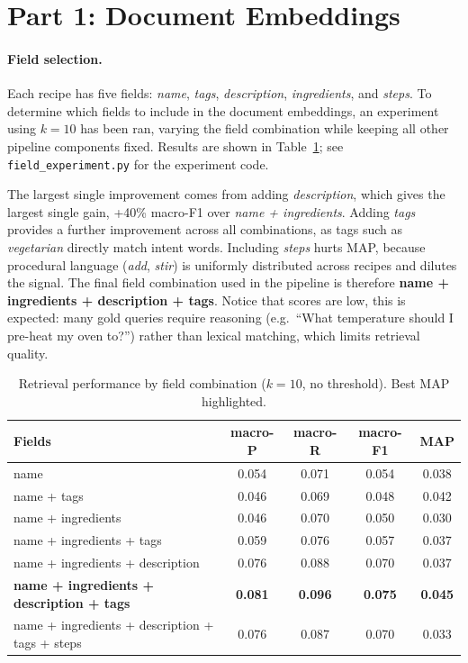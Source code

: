 \documentclass[a4paper,11pt]{article}
\begin{document}
\newpage
\section*{Part 1: Document Embeddings}
\label{sec:embeddings}

\paragraph{Field selection.}
Each recipe has five fields: \textit{name}, \textit{tags}, \textit{description}, \textit{ingredients}, and \textit{steps}. To determine which fields to include in the document embeddings, an experiment using $k=10$ has been ran, varying the field combination while keeping all other pipeline components fixed. Results are shown in Table~\ref{tab:fields}; see \texttt{field\_experiment.py} for the experiment code.

The largest single improvement comes from adding \textit{description}, which gives the largest single gain, +40\% macro-F1 over \textit{name + ingredients}. Adding \textit{tags} provides a further improvement across all combinations, as tags such as \textit{vegetarian} directly match intent words. Including \textit{steps} hurts MAP, because procedural language (\textit{add}, \textit{stir}) is uniformly distributed across recipes and dilutes the signal. The final field combination used in the pipeline is therefore \textbf{name + ingredients + description + tags}. Notice that scores are low, this is expected: many gold queries require reasoning (e.g.\ ``What temperature should I pre-heat my oven to?'') rather than lexical matching, which limits retrieval quality.
\newpage
\begin{table}[!t]
\centering
\caption{Retrieval performance by field combination ($k=10$, no threshold). Best MAP highlighted.}
\label{tab:fields}
\begin{tabular}{lcccc}
\hline
\textbf{Fields} & \textbf{macro-P} & \textbf{macro-R} & \textbf{macro-F1} & \textbf{MAP} \\
\hline
name & 0.054 & 0.071 & 0.054 & 0.038 \\
name + tags & 0.046 & 0.069 & 0.048 & 0.042 \\
name + ingredients & 0.046 & 0.070 & 0.050 & 0.030 \\
name + ingredients + tags & 0.059 & 0.076 & 0.057 & 0.037 \\
name + ingredients + description & 0.076 & 0.088 & 0.070 & 0.037 \\
\textbf{name + ingredients + description + tags} & \textbf{0.081} & \textbf{0.096} & \textbf{0.075} & \textbf{0.045} \\
name + ingredients + description + tags + steps & 0.076 & 0.087 & 0.070 & 0.033 \\
\hline
\end{tabular}
\end{table}
\end{document}

